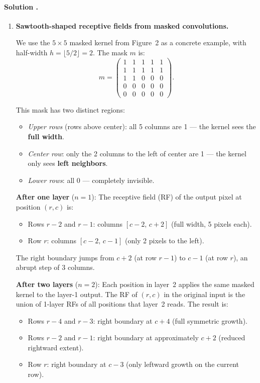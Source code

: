 \documentclass{article}
\newcounter{solutionCount}
\newcommand{\solution}[1]{
    \stepcounter{solutionCount}
    \paragraph{Solution \thesolutionCount.}
    {
        #1
    }
}
\begin{document}
\solution{
    \begin{enumerate}
        \item \textbf{Sawtooth-shaped receptive fields from masked convolutions.}

        We use the $5 \times 5$ masked kernel from Figure~2 as a concrete example, with half-width $h = \lfloor 5/2 \rfloor = 2$. The mask $m$ is:
        \[
        m = \begin{pmatrix}
        1 & 1 & 1 & 1 & 1 \\
        1 & 1 & 1 & 1 & 1 \\
        1 & 1 & 0 & 0 & 0 \\
        0 & 0 & 0 & 0 & 0 \\
        0 & 0 & 0 & 0 & 0
        \end{pmatrix}.
        \]

        This mask has two distinct regions:
        \begin{itemize}
            \item \emph{Upper rows} (rows above center): all 5 columns are 1 --- the kernel sees the \textbf{full width}.
            \item \emph{Center row}: only the 2 columns to the left of center are 1 --- the kernel only sees \textbf{left neighbors}.
            \item \emph{Lower rows}: all 0 --- completely invisible.
        \end{itemize}

        \textbf{After one layer} ($n=1$): The receptive field (RF) of the output pixel at position $(r, c)$ is:
        \begin{itemize}
            \item Rows $r{-}2$ and $r{-}1$: columns $[c{-}2, \, c{+}2]$ (full width, 5 pixels each).
            \item Row $r$: columns $[c{-}2, \, c{-}1]$ (only 2 pixels to the left).
        \end{itemize}
        The right boundary jumps from $c{+}2$ (at row $r{-}1$) to $c{-}1$ (at row $r$), an abrupt step of 3 columns.

        \textbf{After two layers} ($n=2$): Each position in layer~2 applies the same masked kernel to the layer-1 output. The RF of $(r,c)$ in the original input is the union of 1-layer RFs of all positions that layer~2 reads. The result is:
        \begin{itemize}
            \item Rows $r{-}4$ and $r{-}3$: right boundary at $c{+}4$ (full symmetric growth).
            \item Rows $r{-}2$ and $r{-}1$: right boundary at approximately $c{+}2$ (reduced rightward extent).
            \item Row $r$: right boundary at $c{-}3$ (only leftward growth on the current row).
        \end{itemize}


\end{enumerate}}
\end{document}
